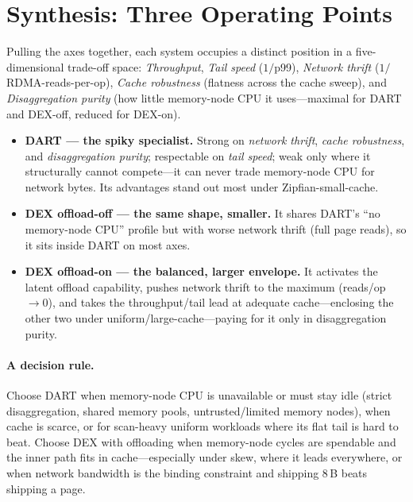\documentclass[sigconf,nonacm]{acmart}
\begin{document}
\section{Synthesis: Three Operating Points}
\label{sec:synth}
Pulling the axes together, each system occupies a distinct position in a
five-dimensional trade-off space: \emph{Throughput}, \emph{Tail speed}
($1/$p99), \emph{Network thrift} ($1/$RDMA-reads-per-op), \emph{Cache
robustness} (flatness across the cache sweep), and \emph{Disaggregation purity}
(how little memory-node CPU it uses---maximal for DART and DEX-off, reduced for
DEX-on).

\begin{itemize}
  \item \textbf{DART --- the spiky specialist.} Strong on \emph{network thrift},
        \emph{cache robustness}, and \emph{disaggregation purity}; respectable on
        \emph{tail speed}; weak only where it structurally cannot compete---it
        can never trade memory-node CPU for network bytes. Its advantages stand
        out most under Zipfian-small-cache.
  \item \textbf{DEX offload-off --- the same shape, smaller.} It shares DART's
        ``no memory-node CPU'' profile but with worse network thrift (full page
        reads), so it sits inside DART on most axes.
  \item \textbf{DEX offload-on --- the balanced, larger envelope.} It activates
        the latent offload capability, pushes network thrift to the maximum
        (reads/op $\to0$), and takes the throughput/tail lead at adequate
        cache---enclosing the other two under uniform/large-cache---paying for it
        only in disaggregation purity.
\end{itemize}

\paragraph{A decision rule.}
Choose DART when memory-node CPU is unavailable or must stay idle (strict
disaggregation, shared memory pools, untrusted/limited memory nodes), when cache
is scarce, or for scan-heavy uniform workloads where its flat tail is hard to
beat. Choose DEX with offloading when memory-node cycles are spendable and the
inner path fits in cache---especially under skew, where it leads everywhere, or
when network bandwidth is the binding constraint and shipping 8\,B beats shipping
a page.
\end{document}
